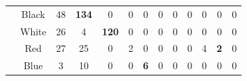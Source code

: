 \documentclass[runningheads]{llncs}
\begin{document}
\begin{table}[]
{\begin{tabular}{ccccccccccccc}
\multicolumn{1}{|l|}{}                                & \multicolumn{1}{c|}{Black}     & \multicolumn{1}{c|}{48}                                   & \multicolumn{1}{c|}{\cellcolor[HTML]{32CB00}\textbf{134}} & \multicolumn{1}{c|}{0}                                    & \multicolumn{1}{c|}{0}                                  & \multicolumn{1}{c|}{0}                                  & \multicolumn{1}{c|}{0}                                  & \multicolumn{1}{c|}{0}                                  & \multicolumn{1}{c|}{0}                                  & \multicolumn{1}{c|}{0}                                  & \multicolumn{1}{c|}{0}                                  & \multicolumn{1}{c|}{0}                                  \\ \cline{2-13} 
\multicolumn{1}{|l|}{}                                & \multicolumn{1}{c|}{White}     & \multicolumn{1}{c|}{26}                                   & \multicolumn{1}{c|}{4}                                    & \multicolumn{1}{c|}{\cellcolor[HTML]{32CB00}\textbf{120}} & \multicolumn{1}{c|}{0}                                  & \multicolumn{1}{c|}{0}                                  & \multicolumn{1}{c|}{0}                                  & \multicolumn{1}{c|}{0}                                  & \multicolumn{1}{c|}{0}                                  & \multicolumn{1}{c|}{0}                                  & \multicolumn{1}{c|}{0}                                  & \multicolumn{1}{c|}{0}                                  \\ \cline{2-13} 
\multicolumn{1}{|l|}{}                                & \multicolumn{1}{c|}{Red}       & \multicolumn{1}{c|}{27}                                   & \multicolumn{1}{c|}{25}                                   & \multicolumn{1}{c|}{0}                                    & \multicolumn{1}{c|}{2}                                  & \multicolumn{1}{c|}{0}                                  & \multicolumn{1}{c|}{0}                                  & \multicolumn{1}{c|}{0}                                  & \multicolumn{1}{c|}{0}                                  & \multicolumn{1}{c|}{4}                                  & \multicolumn{1}{c|}{\cellcolor[HTML]{FE0000}\textbf{2}} & \multicolumn{1}{c|}{0}                                  \\ \cline{2-13} 
\multicolumn{1}{|l|}{}                                & \multicolumn{1}{c|}{Blue}      & \multicolumn{1}{c|}{3}                                    & \multicolumn{1}{c|}{10}                                   & \multicolumn{1}{c|}{0}                                    & \multicolumn{1}{c|}{0}                                  & \multicolumn{1}{c|}{\cellcolor[HTML]{32CB00}\textbf{6}} & \multicolumn{1}{c|}{0}                                  & \multicolumn{1}{c|}{0}                                  & \multicolumn{1}{c|}{0}                                  & \multicolumn{1}{c|}{0}                                  & \multicolumn{1}{c|}{0}                                  & \multicolumn{1}{c|}{0}                                  \\ \cline{2-13} 

\end{tabular}}
\end{table}
\end{document}
